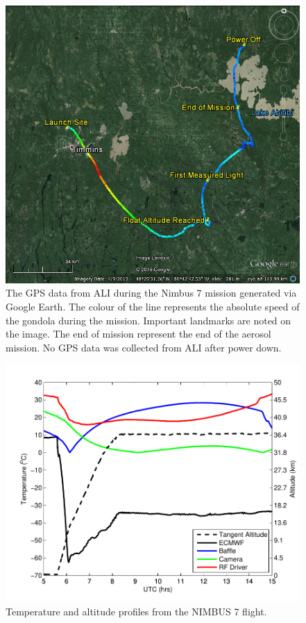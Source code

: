 \documentclass[12pt]{article}
\begin{document}
\newpage

\begin{figure}
    \includegraphics[width=1.0\textwidth]{./Images/5-1-AliGpsDataGoogleMaps.jpg}
    \caption{The GPS data from ALI during the Nimbus 7 mission generated via Google Earth. The colour of the line represents the absolute speed of the gondola during the mission. Important landmarks are noted on the image. The end of mission represent the end of the aerosol mission. No GPS data was collected from ALI after power down.}
    \label{fig:5.1:nimbus7FlightPath}
\end{figure}

\newpage

\begin{figure}
    \includegraphics[width=1.0\textwidth]{./Images/5-1-FlightTemperatures.pdf}
    \caption{Temperature and altitude profiles from the NIMBUS 7 flight.}
    \label{fig:nimbus7Temps}
\end{figure}
\end{document}

